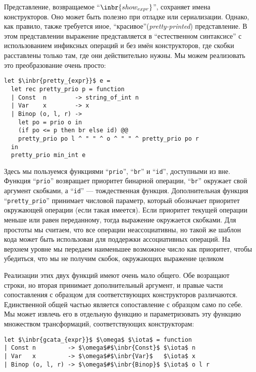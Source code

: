 Представление, возвращаемое ``$\inbr{show_{expr}}$'', сохраняет имена конструкторов. Оно может быть
полезно при отладке или сериализации. Однако, как правило, также требуется иное, ``красивое''(\emph{pretty-printed}) представление. 
В этом представлении выражение представляется в ``естественном синтаксисе'' с использованием инфиксных операций и без имён 
конструкторов, где скобки расставлены только там, где они действительно нужны. Мы можем реализовать это преобразование 
очень просто:

\begin{lstlisting}
let $\inbr{pretty_{expr}}$ e =
  let rec pretty_prio p = function
  | Const  n        -> string_of_int n
  | Var    x        -> x
  | Binop (o, l, r) ->
    let po = prio o in
    (if po <= p then br else id) @@
    pretty_prio po l ^ " " ^ o ^ " " ^ pretty_prio po r
  in
  pretty_prio min_int e
\end{lstlisting}

Здесь мы пользуемся функциями ``\lstinline{prio}'', ``\lstinline{br}'' и ``\lstinline{id}'', доступными из вне. Функция ``\lstinline{prio}''
возвращает приоритет бинарной операции, ``\lstinline{br}'' окружает свой аргумент скобками, а ``\lstinline{id}'' --- тождественная функция.
Дополнительная функция ``\lstinline{pretty_prio}'' принимает числовой параметр, который обозначает приоритет окружающей операции (если такая имеется). Если приоритет текущей операции меньше или равен переданному, тогда выражение окружается скобками. Для простоты мы считаем, что все операции неассоциативны, но такой же шаблон кода может быть использован для поддержки ассоциативных операций.
На верхнем уровне мы передаем наименьшее возможное число как приоритет, чтобы убедиться, что мы не получим скобок, окружающих выражение целиком 

Реализации этих двух функций имеют очень мало общего. Обе возращают строки, но вторая принимает дополнительный аргумент, и 
правые части сопоставления с образцом для соответствующих конструкторов различаются. Единственной общей частью является
сопоставление с образцом само по себе. Мы может извлечь его в отдельную функцию и параметризовать эту функцию множеством трансформаций, 
соответствующих конструкторам:

\begin{lstlisting}
let $\inbr{gcata_{expr}}$ $\omega$ $\iota$ = function
| Const n         -> $\omega$#$\inbr{Const}$ $\iota$ n
| Var   x         -> $\omega$#$\inbr{Var}$   $\iota$ x
| Binop (o, l, r) -> $\omega$#$\inbr{Binop}$ $\iota$ o l r
\end{lstlisting}

